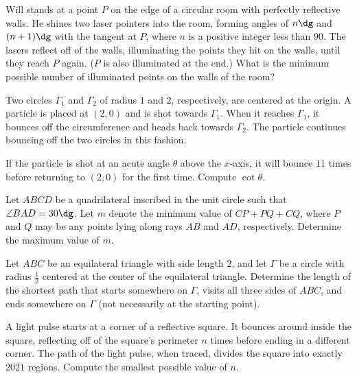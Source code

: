 \documentclass[11pt]{scrartcl}
\begin{document}
\begin{problem} %
    Will stands at a point $P$ on the edge of a circular room with perfectly reflective walls. He shines two laser pointers into the room, forming angles of $n\dg$ and $(n+1)\dg$ with the tangent at $P$, where $n$ is a positive integer less than $90$. The lasers reflect off of the walls, illuminating the points they hit on the walls, until they reach $P$ again. ($P$ is also illuminated at the end.) What is the minimum possible number of illuminated points on the walls of the room?
\end{problem}

\begin{problem} %
    Two circles $\Gamma_1$ and $\Gamma_2$ of radius $1$ and $2$, respectively, are centered at the origin. A particle is placed at $(2,0)$ and is shot towards $\Gamma_1$. When it reaches $\Gamma_1$, it bounces off the circumference and heads back towards $\Gamma_2$. The particle continues bouncing off the two circles in this fashion.

    If the particle is shot at an acute angle $\theta$ above the $x$-axis, it will bounce $11$ times before returning to $(2,0)$ for the first time. Compute $\cot\theta$.
\end{problem}

\begin{problem} %
    Let $ABCD$ be a quadrilateral inscribed in the unit circle such that $\angle BAD = 30\dg$. Let $m$ denote the minimum value of $CP + PQ + CQ$, where $P$ and $Q$ may be any points lying along rays $AB$ and $AD$, respectively. Determine the maximum value of $m$.
\end{problem}

\begin{problem} %
    Let $ABC$ be an equilateral triangle with side length $2$, and let $\Gamma$ be a circle with radius $\frac 12$ centered at the center of the equilateral triangle. Determine the length of the shortest path that starts somewhere on $\Gamma$, visits all three sides of $ABC$, and ends somewhere on $\Gamma$ (not necessarily at the starting point).
\end{problem}

\begin{problem} %
    A light pulse starts at a corner of a reflective square. It bounces around inside the square, reflecting off of the square's perimeter $n$ times before ending in a different corner. The path of the light pulse, when traced, divides the square into exactly $2021$ regions. Compute the smallest possible value of $n$.
\end{problem}
\end{document}
